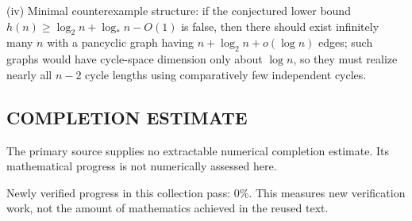 (iv) Minimal counterexample structure: if the conjectured lower bound $h(n)\ge \log_2 n+\log_* n-O(1)$ is false, then there should exist infinitely many $n$ with a pancyclic graph having $n+\log_2 n+o(\log n)$ edges; such graphs would have cycle-space dimension only about $\log n$, so they must realize nearly all $n-2$ cycle lengths using comparatively few independent cycles.




\subsection*{COMPLETION ESTIMATE}
The primary source supplies no extractable numerical completion estimate. Its mathematical progress is not numerically assessed here.

Newly verified progress in this collection pass: $0\%$. This measures new verification work, not the amount of mathematics achieved in the reused text.
